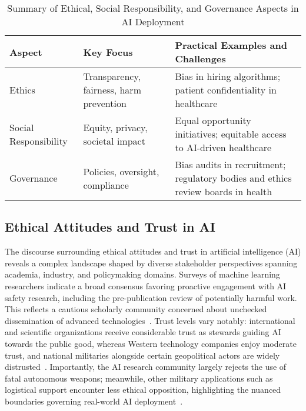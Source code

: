 \documentclass[sigconf]{acmart}
\begin{document}
\begin{table*}[htbp]
\centering
\caption{Summary of Ethical, Social Responsibility, and Governance Aspects in AI Deployment}
\label{tab:ethical_governance_summary}
\begin{adjustbox}{max width=\textwidth}
\begin{tabular}{@{}lll@{}}
\toprule
Aspect           & Key Focus                               & Practical Examples and Challenges                                              \\ \midrule
Ethics           & Transparency, fairness, harm prevention & Bias in hiring algorithms; patient confidentiality in healthcare              \\
Social Responsibility & Equity, privacy, societal impact        & Equal opportunity initiatives; equitable access to AI-driven healthcare       \\
Governance       & Policies, oversight, compliance          & Bias audits in recruitment; regulatory bodies and ethics review boards in health \\ \bottomrule
\end{tabular}
\end{adjustbox}
\end{table*}

\subsection{Ethical Attitudes and Trust in AI}

The discourse surrounding ethical attitudes and trust in artificial intelligence (AI) reveals a complex landscape shaped by diverse stakeholder perspectives spanning academia, industry, and policymaking domains. Surveys of machine learning researchers indicate a broad consensus favoring proactive engagement with AI safety research, including the pre-publication review of potentially harmful work. This reflects a cautious scholarly community concerned about unchecked dissemination of advanced technologies~\cite{ref9}. Trust levels vary notably: international and scientific organizations receive considerable trust as stewards guiding AI towards the public good, whereas Western technology companies enjoy moderate trust, and national militaries alongside certain geopolitical actors are widely distrusted~\cite{ref9,ref25}. Importantly, the AI research community largely rejects the use of fatal autonomous weapons; meanwhile, other military applications such as logistical support encounter less ethical opposition, highlighting the nuanced boundaries governing real-world AI deployment~\cite{ref9,ref25}.
\end{document}
